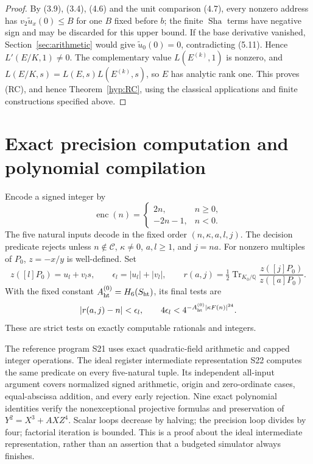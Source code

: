 \documentclass[11pt]{article}
\theoremstyle{definition}
\theoremstyle{remark}
\newcommand{\Q}{\mathbb Q}
\newcommand{\Cset}{\mathcal C}
\newcommand{\Sha}{\operatorname{Sha}}
\newcommand{\Tr}{\operatorname{Tr}}
\begin{document}
\begin{proof}
By (3.9), (3.4), (4.6) and the unit comparison (4.7), every nonzero address has
$v_2\widetilde u_x(0)\le B$ for one $B$ fixed before $b$; the finite
$\Sha$ terms have negative sign and may be discarded for this upper
bound. If the base derivative vanished, Section~\ref{sec:arithmetic}
would give $\widetilde u_0(0)=0$, contradicting (5.11).
Hence $L'(E/K,1)\ne0$. The complementary value $L(E^{(k)},1)$ is
nonzero, and
$L(E/K,s)=L(E,s)L(E^{(k)},s)$, so $E$ has analytic rank one.
This proves (RC), and hence Theorem~\ref{hyp:RC}, using the classical
applications and finite constructions specified above.
\end{proof}



\section{Exact precision computation and polynomial compilation}\label{sec:compiler}
Encode a signed integer by
\[
 \operatorname{enc}(n)=\begin{cases}2n,&n\ge0,\\-2n-1,&n<0.\end{cases}
\]
The five natural inputs decode in the fixed order $(n,\kappa,a,l,j)$.
The decision predicate rejects unless
$n\notin\Cset$, $\kappa\ne0$, $a,l\ge1$, and $j=na$.
For nonzero multiples of $P_0$, $z=-x/y$ is well-defined. Set
\[
 z([l]P_0)=u_l+v_ls,\qquad\epsilon_l=|u_l|+|v_l|,
 \qquad r(a,j)=\tfrac12\Tr_{K_0/\Q}\frac{z([j]P_0)}{z([a]P_0)}.
\]
With the fixed constant $A_{\rm ht}^{(0)}=H_6(S_{\rm ht})$, its final
tests are
\[
 |r(a,j)-n|<\epsilon_l,\qquad
 4\epsilon_l<4^{-A_{\rm ht}^{(0)}|\kappa F(n)|^{24}}.
\]
These are strict tests on exactly computable rationals and integers.

The reference program S21 uses exact quadratic-field arithmetic and capped
integer operations. The ideal register intermediate representation S22
computes the same predicate on every five-natural tuple. Its independent
all-input argument covers normalized signed arithmetic, origin and
zero-ordinate cases, equal-abscissa addition, and every early rejection.
Nine exact polynomial identities verify the nonexceptional projective
formulas and preservation of $Y^2=X^3+AXZ^4$. Scalar loops decrease by
halving; the precision loop divides by four; factorial iteration is bounded.
This is a proof about the ideal intermediate representation, rather than
an assertion that a budgeted simulator always finishes.
\end{document}
